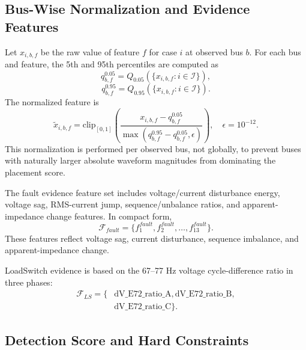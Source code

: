 \documentclass[conference]{IEEEtran}
\begin{document}
\subsection{Bus-Wise Normalization and Evidence Features}

Let $x_{i,b,f}$ be the raw value of feature $f$ for case $i$ at observed bus $b$. For each bus and feature, the 5th and 95th percentiles are computed as
\begin{equation}
q_{b,f}^{0.05}=Q_{0.05}(\{x_{i,b,f}:i\in\mathcal{I}\}),
\end{equation}
\begin{equation}
q_{b,f}^{0.95}=Q_{0.95}(\{x_{i,b,f}:i\in\mathcal{I}\}).
\end{equation}
The normalized feature is
\begin{equation}
\tilde{x}_{i,b,f}=\mathrm{clip}_{[0,1]}\left(\frac{x_{i,b,f}-q_{b,f}^{0.05}}{\max(q_{b,f}^{0.95}-q_{b,f}^{0.05},\epsilon)}\right),\quad \epsilon=10^{-12}.
\end{equation}
This normalization is performed per observed bus, not globally, to prevent buses with naturally larger absolute waveform magnitudes from dominating the placement score.

The fault evidence feature set includes voltage/current disturbance energy,
voltage sag, RMS-current jump, sequence/unbalance ratios, and apparent-
impedance change features. In compact form,
\begin{equation}
\mathcal{F}_{fault}=\{f^{fault}_1,f^{fault}_2,\ldots,f^{fault}_{13}\}.
\end{equation}
These features reflect voltage sag, current disturbance, sequence imbalance, and apparent-impedance change.

LoadSwitch evidence is based on the 67--77 Hz voltage cycle-difference ratio in three phases:
\begin{align}
\mathcal{F}_{LS}=\{&\mathrm{dV\_E72\_ratio\_A},
\mathrm{dV\_E72\_ratio\_B},\nonumber\\
&\mathrm{dV\_E72\_ratio\_C}\}.
\end{align}

\subsection{Detection Score and Hard Constraints}
\end{document}
